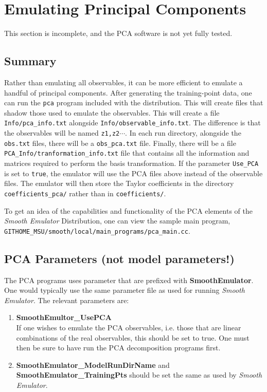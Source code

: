 \documentclass[main.tex]{subfiles}
\begin{document}
\setcounter{section}{5}
\section{Emulating Principal Components}\label{sec:pca}

This section is incomplete, and the PCA software is not yet fully tested. 

\subsection{Summary}

Rather than emulating all observables, it can be more efficient to emulate a handful of principal components. After generating the training-point data, one can run the {\tt pca} program included with the distribution. This will create files that shadow those used to emulate the observables. This will create a file {\tt Info/pca\_info.txt} alongside {\tt Info/observable\_info.txt}. The difference is that the observables will be named {\tt z1,z2}$\cdots$. In each run directory, alongside the {\tt obs.txt} files, there will be a {\tt obs\_pca.txt} file. Finally, there will be a file {\tt PCA\_Info/tranformation\_info.txt} file that contains all the information and matrices required to perform the basis transformation. If the parameter {\tt Use\_PCA} is set to {\tt true}, the emulator will use the PCA files above instead of the observable files. The emulator will then store the Taylor coefficients in the directory {\tt coefficients\_pca/} rather than in {\tt coefficients/}. 

To get an idea of the capabilities and functionality of the PCA elements of the {\it Smooth Emulator} Distribution, one can view the sample main program,\\
{\tt GITHOME\_MSU/smooth/local/main\_programs/pca\_main.cc}. 

\subsection{PCA Parameters (not model parameters!)}
The PCA programs uses parameter that are prefixed with {\bf SmoothEmulator}. One would typically use the same parameter file as used for running {\it Smooth Emulator}. The relevant parameters are:
\begin{enumerate}\itemsep=0pt
\item {\bf SmoothEmultor\_UsePCA}\\
If one wishes to emulate the PCA observables, i.e. those that are linear combinations of the real observables, this should be set to true. One must then be sure to have run the PCA decomposition programs first. 
\item {\bf SmoothEmulator\_ModelRunDirName} and {\bf SmoothEmulator\_TrainingPts} should be set the same as used by {\it Smooth Emulator}.
\end{enumerate}
\end{document}
